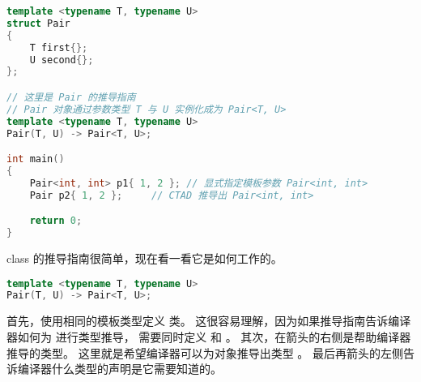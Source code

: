 \documentclass[../../LearnCpp.tex]{subfiles}
\begin{document}
\begin{lstlisting}[language=C++]
template <typename T, typename U>
struct Pair
{
    T first{};
    U second{};
};

// 这里是 Pair 的推导指南
// Pair 对象通过参数类型 T 与 U 实例化成为 Pair<T, U>
template <typename T, typename U>
Pair(T, U) -> Pair<T, U>;

int main()
{
    Pair<int, int> p1{ 1, 2 }; // 显式指定模板参数 Pair<int, int>
    Pair p2{ 1, 2 };     // CTAD 推导出 Pair<int, int>

    return 0;
}
\end{lstlisting}

 class 的推导指南很简单，现在看一看它是如何工作的。

\begin{lstlisting}[language=C++]
template <typename T, typename U>
Pair(T, U) -> Pair<T, U>;
\end{lstlisting}

首先，使用相同的模板类型定义  类。
这很容易理解，因为如果推导指南告诉编译器如何为  进行类型推导，
需要同时定义  和 。
其次，在箭头的右侧是帮助编译器推导的类型。
这里就是希望编译器可以为对象推导出类型 。
最后再箭头的左侧告诉编译器什么类型的声明是它需要知道的。
\end{document}
